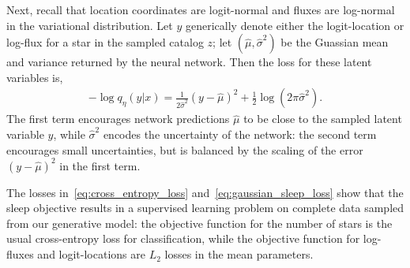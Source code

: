 Next, recall that location coordinates are logit-normal and fluxes are log-normal in the variational distribution.
Let $y$ generically denote either the logit-location or log-flux for a star in the sampled catalog $z$; let $(\hat\mu, \hat\sigma^2)$ be the Guassian mean and variance returned by the neural network. Then the loss for these latent variables is,
\begin{align}
    -\log q_\eta(y | x) =
        \frac{1}{2\hat\sigma^2}(y - \hat\mu)^2
         + \frac{1}{2}\log(2\pi\hat\sigma^2).
         \label{eq:gaussian_sleep_loss}
\end{align}
The first term encourages network predictions $\hat\mu$ to be close to the sampled latent variable $y$, while $\hat\sigma^2$ encodes the uncertainty of the network: the second term encourages small uncertainties, but is
balanced by the scaling of the error $(y - \hat\mu)^2$ in the first term.



The losses in~\eqref{eq:cross_entropy_loss} and~\eqref{eq:gaussian_sleep_loss} show that the sleep objective results in a supervised learning problem on complete data sampled from our generative model: the objective function for the number of stars is the usual cross-entropy loss for classification, while the objective function for log-fluxes and logit-locations are $L_2$ losses in the mean parameters.



